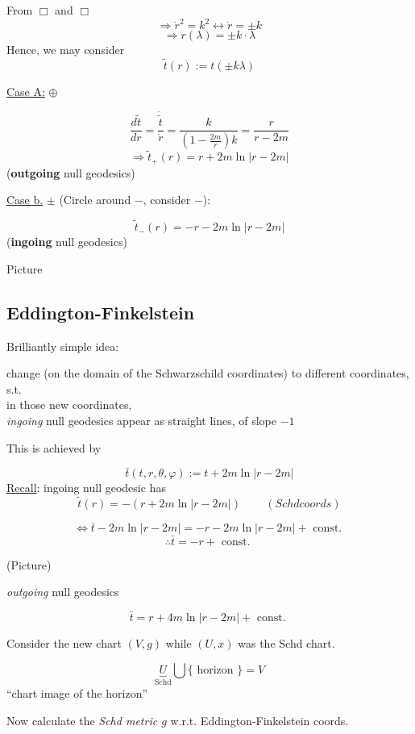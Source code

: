 	From $\Box $ and $\Box $
	\[
	\Longrightarrow \dot{r}^2 = k^2 \leftrightarrow \dot{r} = \pm k
	\]
	\[
	\Longrightarrow r(\lambda) = \pm k \cdot \lambda
	\]
	Hence, we may consider 
	\[
	\widetilde{t}(r) := t(\pm k\lambda)
	\]
	
	\underline{Case A:} $\oplus$
	
	\[
	\frac{d\widetilde{t}}{dr} = \frac{ \dot{ \widetilde{t}} }{ \dot{r}} = \frac{k}{ \left( 1 - \frac{2m}{r} \right) k } = \frac{r}{r-2m}
	\]
	\[
	\Longrightarrow \widetilde{t}_+(r) = r + 2m \ln{ |r-2m | }
	\]
	(\textbf{outgoing} null geodesics)
	
	\underline{Case b.} $\pm$ (Circle around $-$, consider $-$):
	
	\[
	\widetilde{t}_-(r) = -r - 2m \ln{ |r - 2m | }
	\]
	(\textbf{ingoing} null geodesics)
	
	Picture
	
	\subsection{Eddington-Finkelstein}
	
	Brilliantly simple idea: 
	
	change (on the domain of the Schwarzschild coordinates) to different coordinates, s.t.  \\ 
	in those new coordinates, \\
	\emph{ingoing} null geodesics appear as straight lines, of slope $-1$ 
	
	This is achieved by 
	
	\[
	\bar{t}(t,r,\theta, \varphi) := t + 2m \ln{ | r-2m | }
	\]
	\underline{Recall}: ingoing null geodesic has 
	\[
	\widetilde{t}(r) = -(r + 2m \ln{ |r-2m |} )  \quad \quad \, (Schd coords)
	\]
	
	\[
	\Longleftrightarrow \bar{t} - 2m \ln{ |r-2m |} = -r - 2m \ln{ |r-2m |} + \text{ const. }
	\]
	\[
	\therefore \bar{t} = -r + \text{ const. }
	\]
	
	(Picture)
	
	\emph{outgoing} null geodesics
	
	\[
	\bar{t} = r + 4 m \ln{ |r - 2m| } + \text{ const. }
	\]
	
	Consider the new chart $(V,g)$ while $(U,x)$ was the Schd chart.
	
	\[
	\underbrace{U}_{\text{Schd}} \bigcup \lbrace \text{ horizon } \rbrace = V
	\]
	``chart image of the horizon''
	
	Now calculate the \emph{Schd metric $g$ } w.r.t. Eddington-Finkelstein coords.
	
